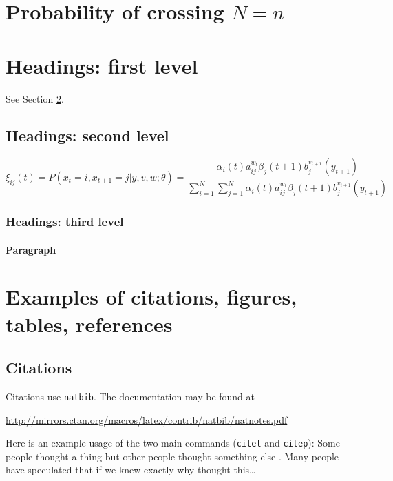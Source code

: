 \documentclass{article}
\begin{document}
\section{Probability of crossing $N=n$}


\section{Headings: first level}
\label{sec:headings}

\lipsum[4] See Section \ref{sec:headings}.

\subsection{Headings: second level}
\lipsum[5]
\begin{equation} 
	\xi _{ij}(t)=P(x_{t}=i,x_{t+1}=j|y,v,w;\theta)= {\frac {\alpha _{i}(t)a^{w_t}_{ij}\beta _{j}(t+1)b^{v_{t+1}}_{j}(y_{t+1})}{\sum _{i=1}^{N} \sum _{j=1}^{N} \alpha _{i}(t)a^{w_t}_{ij}\beta _{j}(t+1)b^{v_{t+1}}_{j}(y_{t+1})}}
\end{equation}



\subsubsection{Headings: third level}
\lipsum[6]

\paragraph{Paragraph}
\lipsum[7]



\section{Examples of citations, figures, tables, references}
\label{sec:others}

\subsection{Citations}
Citations use \verb+natbib+. The documentation may be found at
\begin{center}
	\url{http://mirrors.ctan.org/macros/latex/contrib/natbib/natnotes.pdf}
\end{center}

Here is an example usage of the two main commands (\verb+citet+ and \verb+citep+): Some people thought a thing \citep{kour2014real, hadash2018estimate} but other people thought something else \citep{kour2014fast}. Many people have speculated that if we knew exactly why \citet{kour2014fast} thought this\dots
\end{document}
